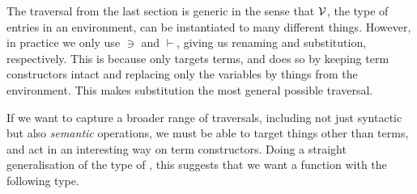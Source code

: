The traversal  from the last section is generic in the sense
that $\mathcal V$, the type of entries in an environment, can be instantiated to many
different things.
However, in practice we only use $\ni$ and $\vdash$, giving us renaming and
substitution, respectively.
This is because  only targets terms, and does so by keeping
term constructors intact and replacing only the variables by things from the
environment.
This makes substitution the most general possible traversal.

If we want to capture a broader range of traversals, including not just
syntactic but also \emph{semantic} operations, we must be able to target things
other than terms, and act in an interesting way on term constructors.
Doing a straight generalisation of the type of , this
suggests that we want a function with the following type.

